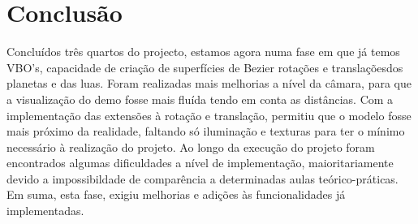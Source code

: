 \chapter{Conclusão}

Concluídos três quartos do projecto, estamos agora numa fase em que já temos VBO's, capacidade de criação de superfícies de Bezier rotações e translaçõesdos planetas e das luas.
Foram realizadas mais melhorias a nível da câmara, para que a visualização do demo fosse mais fluída tendo em conta as distâncias.
Com a implementação das extensões à rotação e translação, permitiu que o modelo fosse mais próximo da realidade, faltando só iluminação e texturas para ter o mínimo necessário à realização do projeto.
Ao longo da execução do projeto foram encontrados algumas dificuldades a nível de implementação, maioritariamente devido a impossibildade de comparência a determinadas aulas teórico-práticas. 
Em suma, esta fase, exigiu melhorias e adições às funcionalidades já implementadas. 